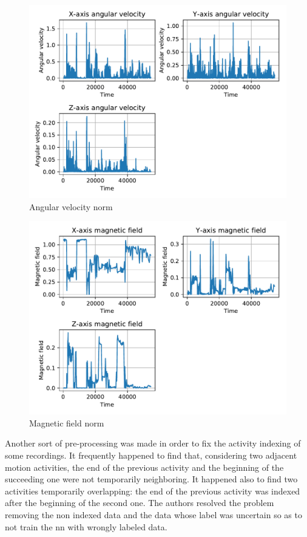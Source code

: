 \begin{figure}[htp]
\includegraphics[scale=0.55]{angular_velocity_susanna.pdf}
\caption{Angular velocity norm}
\label{fig:gyr}
\end{figure}

\begin{figure}[htp]
\includegraphics[scale=0.55]{magnetic_field_susanna.pdf}
\caption{Magnetic field norm}
\label{fig:mag}
\end{figure}


Another sort of pre-processing was made in order to fix the activity indexing of some recordings. It frequently happened to find that, considering two adjacent motion activities, the end of the previous activity and the beginning of the succeeding one were not temporarily neighboring. It happened also to find two activities temporarily overlapping: the end of the previous activity was indexed after the beginning of the second one.
The authors resolved the problem removing the non indexed data and the data whose label was uncertain so as to not train the \gls{nn} with wrongly labeled data.

